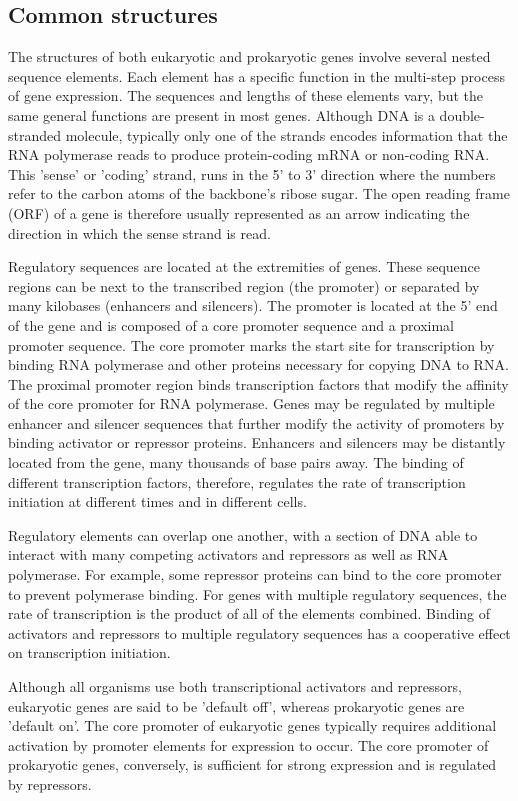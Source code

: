 \subsection{Common structures}
The structures of both eukaryotic and prokaryotic genes involve several nested sequence elements. Each element has a specific 
function in the multi-step process of gene expression. The sequences and lengths of these elements vary, but the same general 
functions are present in most genes. Although DNA is a double-stranded molecule, typically only one of the strands encodes 
information that the RNA polymerase reads to produce protein-coding mRNA or non-coding RNA. This 'sense' or 'coding' strand, 
runs in the 5' to 3' direction where the numbers refer to the carbon atoms of the backbone's ribose sugar. The open reading frame (ORF) 
of a gene is therefore usually represented as an arrow indicating the direction in which the sense strand is read.  

Regulatory sequences are located at the extremities of genes. These sequence regions can be next to the transcribed region 
(the promoter) or separated by many kilobases (enhancers and silencers). The promoter is located at the 5' end of the gene 
and is composed of a core promoter sequence and a proximal promoter sequence. The core promoter marks the start site for 
transcription by binding RNA polymerase and other proteins necessary for copying DNA to RNA. The proximal promoter region 
binds transcription factors that modify the affinity of the core promoter for RNA polymerase. Genes may be regulated by 
multiple enhancer and silencer sequences that further modify the activity of promoters by binding activator or repressor 
proteins. Enhancers and silencers may be distantly located from the gene, many thousands of base pairs away. The binding 
of different transcription factors, therefore, regulates the rate of transcription initiation at different times and in 
different cells.  

Regulatory elements can overlap one another, with a section of DNA able to interact with many competing activators and repressors 
as well as RNA polymerase. For example, some repressor proteins can bind to the core promoter to prevent polymerase binding. For 
genes with multiple regulatory sequences, the rate of transcription is the product of all of the elements combined. Binding of 
activators and repressors to multiple regulatory sequences has a cooperative effect on transcription initiation.  

Although all organisms use both transcriptional activators and repressors, eukaryotic genes are said to be 'default off', 
whereas prokaryotic genes are 'default on'. The core promoter of eukaryotic genes typically requires additional activation 
by promoter elements for expression to occur. The core promoter of prokaryotic genes, conversely, is sufficient for strong 
expression and is regulated by repressors.

